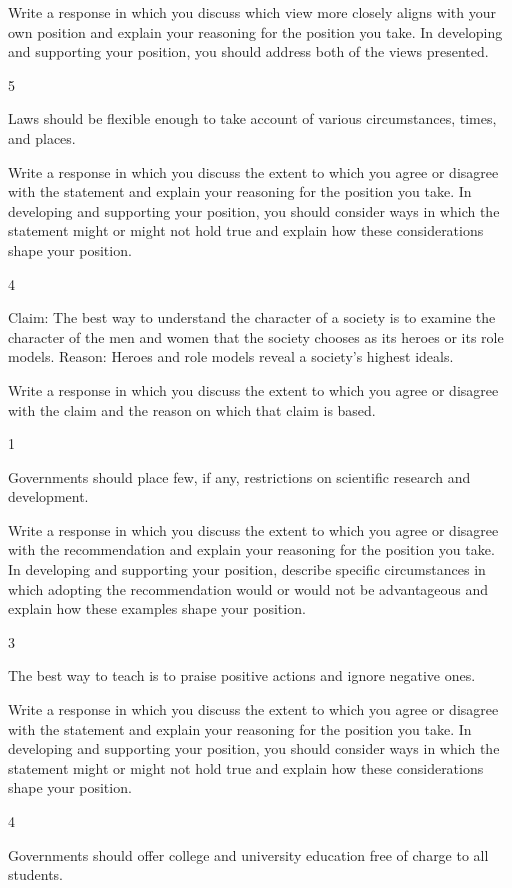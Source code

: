 \documentclass[]{article}
\begin{document}
Write a response in which you discuss which view more closely aligns
with your own position and explain your reasoning for the position you
take. In developing and supporting your position, you should address
both of the views presented.

5

Laws should be flexible enough to take account of various circumstances,
times, and places.

Write a response in which you discuss the extent to which you agree or
disagree with the statement and explain your reasoning for the position
you take. In developing and supporting your position, you should
consider ways in which the statement might or might not hold true and
explain how these considerations shape your position.

4

Claim: The best way to understand the character of a society is to
examine the character of the men and women that the society chooses as
its heroes or its role models. Reason: Heroes and role models reveal a
society's highest ideals.

Write a response in which you discuss the extent to which you agree or
disagree with the claim and the reason on which that claim is based.

1

Governments should place few, if any, restrictions on scientific
research and development.

Write a response in which you discuss the extent to which you agree or
disagree with the recommendation and explain your reasoning for the
position you take. In developing and supporting your position, describe
specific circumstances in which adopting the recommendation would or
would not be advantageous and explain how these examples shape your
position.

3

The best way to teach is to praise positive actions and ignore negative
ones.

Write a response in which you discuss the extent to which you agree or
disagree with the statement and explain your reasoning for the position
you take. In developing and supporting your position, you should
consider ways in which the statement might or might not hold true and
explain how these considerations shape your position.

4

Governments should offer college and university education free of charge
to all students.
\end{document}
